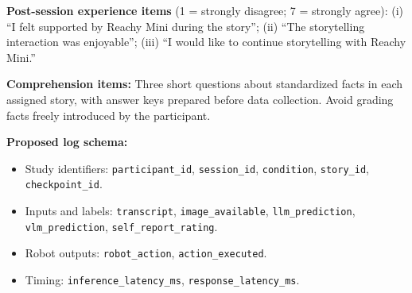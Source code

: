 \documentclass[conference]{IEEEtran}
\begin{document}
\noindent\textbf{Post-session experience items} (1 = strongly disagree; 7 = strongly agree): (i) ``I felt supported by Reachy Mini during the story''; (ii) ``The storytelling interaction was enjoyable''; (iii) ``I would like to continue storytelling with Reachy Mini.''

\noindent\textbf{Comprehension items:} Three short questions about standardized facts in each assigned story, with answer keys prepared before data collection. Avoid grading facts freely introduced by the participant.

\noindent\textbf{Proposed log schema:}
\begin{itemize}
\item Study identifiers: \texttt{participant\_id}, \texttt{session\_id}, \texttt{condition}, \texttt{story\_id}, \texttt{checkpoint\_id}.
\item Inputs and labels: \texttt{transcript}, \texttt{image\_available}, \texttt{llm\_prediction}, \texttt{vlm\_prediction}, \texttt{self\_report\_rating}.
\item Robot outputs: \texttt{robot\_action}, \texttt{action\_executed}.
\item Timing: \texttt{inference\_latency\_ms}, \texttt{response\_latency\_ms}.
\end{itemize}
\end{document}
